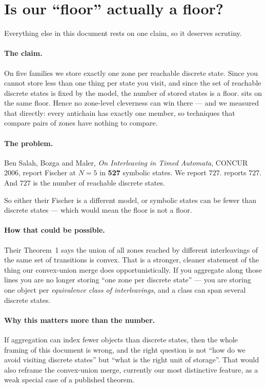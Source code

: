 \section{Is our ``floor'' actually a floor? \hfill \open{}}

Everything else in this document rests on one claim, so it deserves scrutiny.

\paragraph{The claim.} On five families we store exactly one zone per reachable discrete state.
Since you cannot store less than one thing per state you visit, and since the set of reachable
discrete states is fixed by the model, the number of stored states is a floor. \verifyta{} sits on
the same floor. Hence no zone-level cleverness can win there --- and we measured that directly:
every antichain has exactly one member, so techniques that compare pairs of zones have nothing to
compare.

\paragraph{The problem.} Ben Salah, Bozga and Maler, \emph{On Interleaving in Timed Automata},
CONCUR 2006, report Fischer at $N = 5$ in \textbf{527} symbolic states. We report $727$.
\verifyta{} reports $727$. And $727$ is the number of reachable discrete states.

So either their Fischer is a different model, or symbolic states can be fewer than discrete states
--- which would mean the floor is not a floor.

\paragraph{How that could be possible.} Their Theorem~1 says the union of all zones reached by
different interleavings of the same set of transitions is convex. That is a stronger, cleaner
statement of the thing our convex-union merge does opportunistically. If you aggregate along those
lines you are no longer storing ``one zone per discrete state'' --- you are storing one object per
\emph{equivalence class of interleavings}, and a class can span several discrete states.

\paragraph{Why this matters more than the number.} If aggregation can index fewer objects than
discrete states, then the whole framing of this document is wrong, and the right question is not
``how do we avoid visiting discrete states'' but ``what is the right unit of storage''. That would
also reframe the convex-union merge, currently our most distinctive feature, as a weak special
case of a published theorem.

